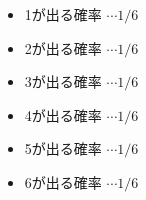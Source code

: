 \begin{itemize}
	\item 1が出る確率 $\cdots 1/6$
	\item 2が出る確率 $\cdots 1/6$
	\item 3が出る確率 $\cdots 1/6$
	\item 4が出る確率 $\cdots 1/6$
	\item 5が出る確率 $\cdots 1/6$
	\item 6が出る確率 $\cdots 1/6$
\end{itemize}
